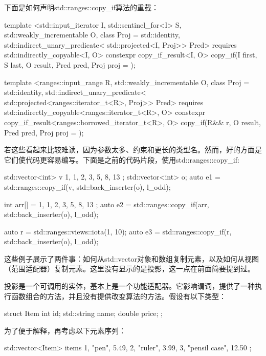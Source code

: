 下面是如何声明std::ranges::copy\_if算法的重载：

\begin{cpp}
template <std::input_iterator I,
		  std::sentinel_for<I> S,
		  std::weakly_incrementable O,
		  class Proj = std::identity,
		  std::indirect_unary_predicate<
		    std::projected<I, Proj>> Pred>
requires std::indirectly_copyable<I, O>
constexpr copy_if_result<I, O> copy_if(I first, S last,
									   O result,
								   	   Pred pred,
									   Proj proj = {} );
									   
template <ranges::input_range R,
		  std::weakly_incrementable O,
		  class Proj = std::identity,
		  std::indirect_unary_predicate<
		  std::projected<ranges::iterator_t<R>, Proj>> Pred>
requires std::indirectly_copyable<ranges::iterator_t<R>, O>
constexpr copy_if_result<ranges::borrowed_iterator_t<R>, O>
		  copy_if(R&& r,
				  O result,
				  Pred pred,
				  Proj proj = {});
\end{cpp}

若这些看起来比较难读，因为参数太多、约束和更长的类型名。然而，好的方面是它们使代码更容易编写。下面是之前的代码片段，使用std::ranges::copy\_if:

\begin{cpp}
std::vector<int> v{ 1, 1, 2, 3, 5, 8, 13 };
std::vector<int> o;
auto e1 = std::ranges::copy_if(v, std::back_inserter(o),
								l_odd);
								
int arr[] = { 1, 1, 2, 3, 5, 8, 13 };
auto e2 = std::ranges::copy_if(arr, std::back_inserter(o),
								l_odd);

auto r = std::ranges::views::iota(1, 10);
auto e3 = std::ranges::copy_if(r, std::back_inserter(o),
								l_odd);
\end{cpp}

这些例子展示了两件事：如何从std::vector对象和数组复制元素，以及如何从视图（范围适配器）复制元素。这里没有显示的是投影，这一点在前面简要提到过。

投影是一个可调用的实体，基本上是一个功能适配器。它影响谓词，提供了一种执行函数组合的方法，并且没有提供改变算法的方法。假设有以下类型：

\begin{cpp}
struct Item
{
	int id;
	std::string name;
	double price;
};
\end{cpp}

为了便于解释，再考虑以下元素序列：

\begin{cpp}
std::vector<Item> items{
	{1, "pen", 5.49},
	{2, "ruler", 3.99},
	{3, "pensil case", 12.50}
};
\end{cpp}

